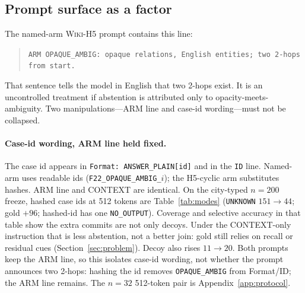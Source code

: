 \documentclass{article}
\begin{document}
\subsection{Prompt surface as a factor}
\label{sec:header}

The named-arm \textsc{Wiki-H5} prompt contains this line:

\begin{quote}
\small
\texttt{ARM OPAQUE\_AMBIG: opaque relations, English entities; two 2-hops from start.}
\end{quote}

That sentence tells the model in English that two 2-hops exist. It is an
uncontrolled treatment if abstention is attributed only to
opacity-meets-ambiguity. Two manipulations---ARM line and case-id
wording---must not be collapsed.

\paragraph{Case-id wording, ARM line held fixed.}
The case id appears in \texttt{Format: ANSWER\_PLAIN[id]} and in the
\texttt{ID} line. Named-arm uses readable ids
(\texttt{F22\_OPAQUE\_AMBIG\_$i$}); the H5-cyclic arm substitutes hashes.
ARM line and CONTEXT are identical.
On the city-typed $n{=}200$ freeze, hashed case ids at 512 tokens are
Table~\ref{tab:modes} (\texttt{UNKNOWN} $151\to 44$; gold ${+}96$; hashed-id has one
\texttt{NO\_OUTPUT}).
Coverage and selective accuracy in that table show the extra commits are
not only decoys.
Under the CONTEXT-only instruction that is less abstention, not a better join:
gold still relies on recall or residual cues (Section~\ref{sec:problem}).
Decoy also rises $11\to 20$.
Both prompts keep the ARM line, so this isolates case-id wording, not
whether the prompt announces two 2-hops: hashing the id removes
\texttt{OPAQUE\_AMBIG} from Format/ID; the ARM line remains.
The $n{=}32$ 512-token pair is Appendix~\ref{app:protocol}.
\end{document}
